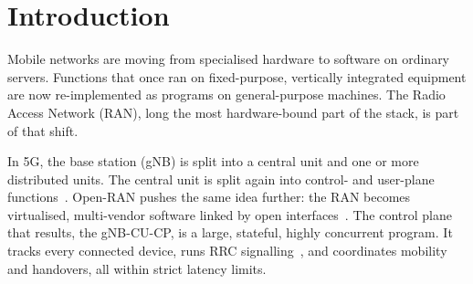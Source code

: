 \documentclass[english,oneside,a4paper,censored,csm,software-track-2020]{HYthesisML}
\begin{document}
\cleardoublepage
{}
\setcounter{page}{1}
\tableofcontents

\cleardoublepage
{}
{}
\listoffigures

\cleardoublepage
{}
{}
\listoftables

\cleardoublepage

\mainmatter

\singlespacing

\chapter{Introduction}

Mobile networks are moving from specialised hardware to software on ordinary servers.
Functions that once ran on fixed-purpose, vertically integrated equipment are now
re-implemented as programs on general-purpose machines. The Radio Access Network (RAN),
long the most hardware-bound part of the stack, is part of that shift.

In 5G, the base station (gNB) is split into a central unit and one or more distributed
units. The central unit is split again into control- and user-plane
functions~\cite{3gpp38401,3gpp38300}. Open-RAN pushes the same idea further: the RAN
becomes virtualised, multi-vendor software linked by open
interfaces~\cite{polese2023oran}. The control plane that results, the gNB-CU-CP, is a
large, stateful, highly concurrent program. It tracks every connected device, runs RRC
signalling~\cite{3gpp38331}, and coordinates mobility and handovers, all within strict
latency limits.
\end{document}
